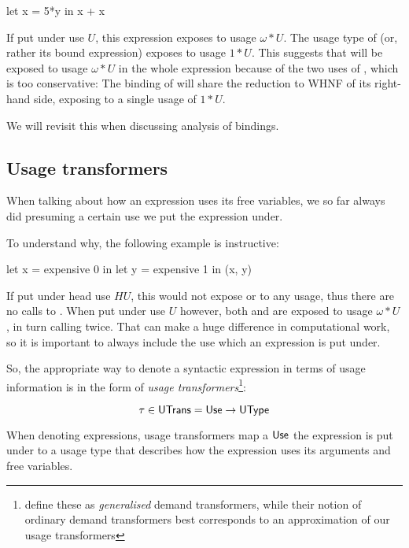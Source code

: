 \begin{haskellcode}
let x = 5*y
in x + x
\end{haskellcode}

If put under use $U$, this expression exposes  to usage $\omega*U$. 
The usage type of  (or, rather its bound expression) exposes  to usage $1*U$.
This suggests that  will be exposed to usage $\omega*U$ in the whole expression because of the two uses of , which is too conservative:
The binding of  will share the reduction to WHNF of its right-hand side, exposing  to a single usage of $1*U$.

We will revisit this when discussing analysis of  bindings.

\subsection{Usage transformers}\label{sec:utrans}

When talking about how an expression uses its free variables, we so far always did presuming a certain use we put the expression under.

To understand why, the following example is instructive:

\begin{haskellcode}
let x = expensive 0
in let y = expensive 1
   in (x, y)
\end{haskellcode}

If put under head use $HU$, this would not expose  or  to any usage, thus there are no calls to .
When put under use $U$ however, both  and  are exposed to usage $\omega*U$, in turn calling  twice.
That can make a huge difference in computational work, so it is important to always include the use which an expression is put under.

So, the appropriate way to denote a syntactic expression in terms of usage information is in the form of \emph{usage transformers}\footnote{\textcite{card} define these as \emph{generalised} demand transformers, while their notion of ordinary demand transformers best corresponds to an approximation of our usage transformers}:

\[
\tau \in \text{\textsf{UTrans}} = \text{\textsf{Use}} \to \text{\textsf{UType}}
\]

When denoting expressions, usage transformers map a $\text{\textsf{Use}}$ the expression is put under to a usage type that describes how the expression uses its arguments and free variables.

